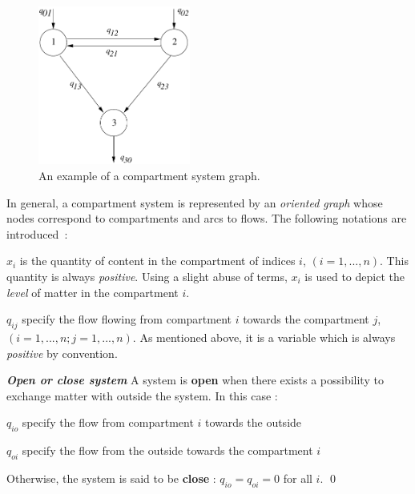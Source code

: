 \begin{figure}[ht]
\begin{center}
\includegraphics[width=5cm]{images/exemplecomp}
\caption{An example of a compartment system graph.}
\label{fig:exemplecomp}
\end{center} 
\end{figure}

In general, a compartment system is represented by an {\em oriented graph} 
whose nodes correspond to compartments and arcs to flows. 
The following notations are introduced~:
\begin{description}
\item $x_i$ is the quantity of content in the compartment of indices $i$,
$(i = 1, ... ,n)$. This quantity is always {\em positive}. Using a slight abuse of terms,
$x_i$ is used to depict the {\em level} of matter in the compartment $i$.
\item $q_{ij}$ specify the flow flowing from compartment $i$ towards the  
compartment $j$, $(i = 1, ... ,n ; j = 1, ... ,n)$. As mentioned above, it is a
variable which is always {\em positive} by convention.
\end{description}

\begin{definition}{\bf \em Open or close system}
A system is {\bf open} when there exists a possibility to exchange matter
with outside the system.
In this case :  
\begin{description}
\item $q_{io}$ specify the flow from  compartment $i$ towards the outside
\item $q_{oi}$ specify the flow from the outside towards the compartment $i$
\end{description}
Otherwise, the system is said to be {\bf close} : $q_{io} = 
q_{oi} = 0$ for all $i$. \qed
\end{definition}

